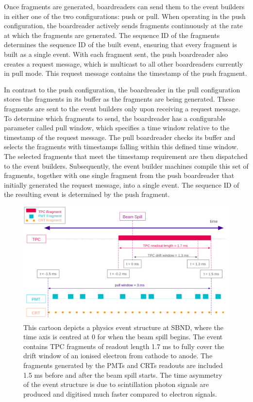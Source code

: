 Once fragments are generated, boardreaders can send them to the event builders in either one of the two configurations: push or pull. 
When operating in the push configuration, the boardreader actively sends fragments continuously at the rate at which the fragments are generated.
The sequence ID of the fragments determines the sequence ID of the built event, ensuring  that every fragment is built as a single event.
With each fragment sent, the push boardreader also creates a request message, which is multicast to all other boardreaders currently in pull mode.
This request message contains the timestamp of the push fragment. 

In contrast to the push configuration, the boardreader in the pull configuration stores the fragments in its buffer as the fragments are being generated.
These fragments are sent to the event builders only upon receiving a request message.
To determine which fragments to send, the boardreader has a configurable parameter called pull window, which specifies a time window relative to the timestamp of the request message.
The pull boardreader checks its buffer and selects the fragments with timestamps falling within this defined time window.
The selected fragments that meet the timestamp requirement are then dispatched to the event builders.
Subsequently, the event builder machines compile this set of fragments, together with one single fragment from the push boardreader that initially generated the request message, into a single event.
The sequence ID of the resulting event is determined by the push fragment.

\begin{figure}[htbp!] 
\centering    
\includegraphics[width=1.0\textwidth]{SBND_Event_Structure}
\caption[SBNDEventStructure]{
This cartoon depicts a physics event structure at SBND, where the time axis is centred at 0 for when the beam spill begins. 
The event contains TPC fragments of readout length 1.7 ms to fully cover the drift window of an ionised electron from cathode to anode. 
The fragments generated by the PMTs and CRTs readouts are included 1.5 ms before and after the beam spill starts. 
The time asymmetry of the event structure is due to scintillation photon signals are produced and digitised much faster compared to electron signals.}
\label{fig:SBNDEventStructure}
\end{figure}

